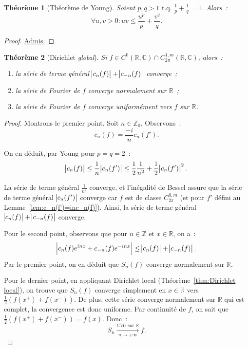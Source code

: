 \documentclass{report}
\newtheorem{thm}{Théorème}[chapter]
\theoremstyle{definition}
\theoremstyle{remark}
\numberwithin{equation}{section}
\newcommand{\C}{\mathbb C}
\newcommand{\R}{\mathbb R}
\newcommand{\Z}{\mathbb Z}
\newcommand{\tq}{\text{ t.q. }}
\newcommand{\CONV}[5]{\xrightarrow[#2 \to #3]{#4 \text{ #5 } #1}}
\newcommand{\CVU}[3]{\CONV{#1}{#2}{#3}{CVU}{sur}}
\newcommand{\pinfty}{{+\infty}}
\newcommand{\grantedproof}{\begin{proof} \underline{Admis.} \end{proof}}
\newcommand{\CmT}[2]{C^{#1,m}_{#2}}
\newcommand{\CzmT}[1]{\CmT 0{#1}}
\newcommand{\Czm}{\CzmT{2\pi}}
\newcommand{\ComT}[1]{\CmT 1{#1}}
\newcommand{\Com}{\ComT {2\pi}}
\begin{document}
			\begin{thm}[Théorème de Young] Soient $p, q > 1 \tq \frac 1p + \frac 1q = 1$. Alors~:
			\begin{equation}
				\forall u, v > 0 : uv \leq \frac {u^p}p + \frac {v^q}q.
			\end{equation}
			\end{thm}

			\grantedproof

			\begin{thm}[Dirichlet \textit{global}] Si $f \in C^0(\R, \C) \cap \Com(\R, \C)$, alors~:
			\begin{enumerate}
				\item la série de terme général $\abs {c_n(f)} + \abs {c_{-n}(f)}$ converge~;
				\item la série de Fourier de $f$ converge normalement sur $\R$~;
				\item la série de Fourier de $f$ converge uniformément vers $f$ sur $\R$.
			\end{enumerate}
			\end{thm}

			\begin{proof} Montrons le premier point. Soit $n \in \Z_0$. Observons~:
			\begin{equation}
				c_n(f) = \frac {-i}nc_n(f').
			\end{equation}

			On en déduit, par Young pour $p=q=2$~:
			\begin{equation}
				\abs {c_n(f)} \leq \frac 1n\abs {c_n(f')} \leq \frac 12\frac 1{n^2} + \frac 12\abs {c_n(f')}^2.
			\end{equation}

			La série de terme général $\frac 1{n^2}$ converge, et l'inégalité de Bessel assure que la série de terme général $\abs {c_n(f')}$ converge car $f$ est
			de classe $\Czm$ (et pour $f'$ défini au Lemme~\ref{lem:c_n(f')=inc_n(f)}). Ainsi, la série de terme général $\abs {c_n(f)} + \abs {c_{-n}(f)}$ converge.

			Pour le second point, observons que pour $n \in \Z$ et $x \in \R$, on a~:
			\begin{equation}
				\abs {c_n(f)e^{inx} + c_{-n}(f)e^{-inx}} \leq \abs {c_n(f)} + \abs {c_{-n}(f)}.
			\end{equation}
			Par le premier point, on en déduit que $S_n(f)$ converge normalement sur $\R$.

			Pour le dernier point, en appliquant Dirichlet local (Théorème~\ref{thm:Dirichlet local}), on trouve que $S_n(f)$ converge simplement en $x \in \R$
			vers $\frac 12(f(x^+)+f(x^-))$. De plus, cette série converge normalement sur $\R$ qui est complet, la convergence est donc uniforme. Par continuité de $f$,
			on sait que $\frac 12(f(x^+)+f(x^-)) = f(x)$. Donc~:
			\begin{equation}
				S_n \CVU \R n\pinfty f.
			\end{equation}
			\end{proof}
\end{document}
